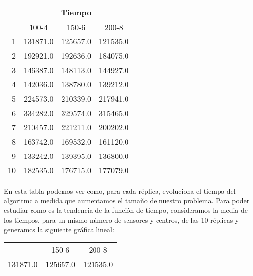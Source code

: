 \documentclass{article}
\begin{document}
\begin{enumerate}
  \begin{center}
    \begin{tabular}{ | r | r | r | r | }
      \hline
      \rowcolor{DarkGrey}
      & \multicolumn{3}{|c|}{Tiempo} \\ \hline
      \rowcolor{DarkGrey}
      \multicolumn{1}{|c|}{Réplica} & \multicolumn{1}{|c|}{100-4} & \multicolumn{1}{|c|}{150-6} & \multicolumn{1}{|c|}{200-8} \\ \hline \hline
      1 & 131871.0 & 125657.0 & 121535.0 \\ \hline
      \rowcolor{LightGrey}
      2 & 192921.0 & 192636.0 & 184075.0 \\ \hline
      3 & 146387.0 & 148113.0 & 144927.0 \\ \hline
      \rowcolor{LightGrey}
      4 & 142036.0 & 138780.0 & 139212.0 \\ \hline
      5 & 224573.0 & 210339.0 & 217941.0 \\ \hline
      \rowcolor{LightGrey}
      6 & 334282.0 & 329574.0 & 315465.0 \\ \hline
      7 & 210457.0 & 221211.0 & 200202.0 \\ \hline
      \rowcolor{LightGrey}
      8 & 163742.0 & 169532.0 & 161120.0 \\ \hline
      9 & 133242.0 & 139395.0 & 136800.0 \\ \hline
      \rowcolor{LightGrey}
      10 & 182535.0 & 176715.0 & 177079.0\\ \hline
    \end{tabular}
  \end{center}

  En esta tabla podemos ver como, para cada réplica, evoluciona el tiempo del algoritmo a medida que aumentamos el tamaño de nuestro problema.
  Para poder estudiar como es la tendencia de la función de tiempo, consideramos la media de los tiempos, para un mismo número de sensores y centros, de las 10 réplicas y generamos la siguiente gráfica lineal:

  \begin{center}
    \begin{tabular}{ | r | r | r | }
      \hline
      \rowcolor{DarkGrey}
       \multicolumn{3}{|c|}{Media de tiempo} \\ \hline
      \rowcolor{DarkGrey}
      \multicolumn{1}{|c|}{100-4} & \multicolumn{1}{|c|}{150-6} & \multicolumn{1}{|c|}{200-8} \\ \hline \hline
       131871.0 & 125657.0 & 121535.0 \\ \hline
       \end{tabular}
  \end{center}




\end{enumerate}
\end{document}
